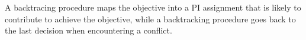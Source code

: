 
A backtracing procedure maps the objective into a PI assignment that is likely to contribute to achieve the objective, while a backtracking procedure goes back to the last decision when encountering a conflict.
